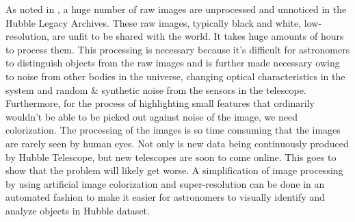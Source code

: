 \documentclass{article} %
\begin{document}
\hspace*{0.167 in}As noted in \cite{Gao2019astronomical}, a huge number of raw images are unprocessed and unnoticed in the Hubble Legacy Archives. These raw images, typically black and white, low-resolution, are unfit to be shared with the world. It takes huge amounts of hours to process them. This processing is necessary because it's difficult for astronomers to distinguish objects from the raw images and is further made necessary owing to noise from other bodies in the universe, changing optical characteristics in the system and random \& synthetic noise from the sensors in the telescope. Furthermore, for the process of highlighting small features that ordinarily wouldn't be able to be picked out against noise of the image, we need colorization. The processing of the images is so time consuming that the images are rarely seen by human eyes. Not only is new data being continuously produced by Hubble Telescope, but new telescopes are soon to come online. This goes to show that the problem will likely get worse. A simplification of image processing by using artificial image colorization and super-resolution can be done in an automated fashion to make it easier for astronomers to visually identify and analyze objects in Hubble dataset.
\end{document}
